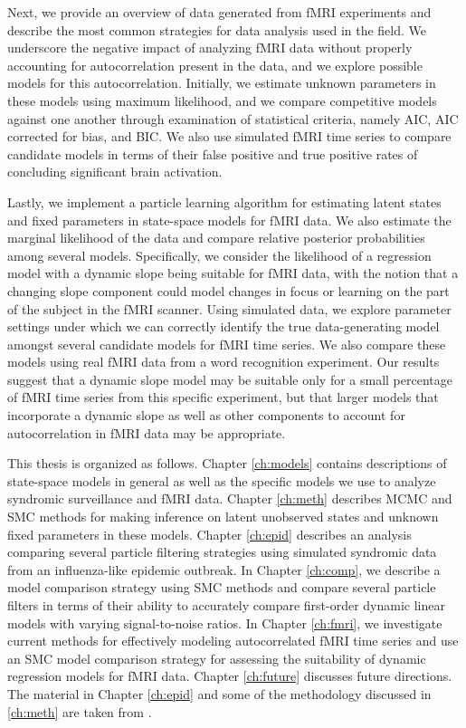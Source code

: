 Next, we provide an overview of data generated from fMRI experiments and describe the most common strategies for data analysis used in the field. We underscore the negative impact of analyzing fMRI data without properly accounting for autocorrelation present in the data, and we explore possible models for this autocorrelation. Initially, we estimate unknown parameters in these models using maximum likelihood, and we compare competitive models against one another through examination of statistical criteria, namely AIC, AIC corrected for bias, and BIC. We also use simulated fMRI time series to compare candidate models in terms of their false positive and true positive rates of concluding significant brain activation.

Lastly, we implement a particle learning algorithm for estimating latent states and fixed parameters in state-space models for fMRI data. We also estimate the marginal likelihood of the data and compare relative posterior probabilities among several models. Specifically, we consider the likelihood of a regression model with a dynamic slope being suitable for fMRI data, with the notion that a changing slope component could model changes in focus or learning on the part of the subject in the fMRI scanner. Using simulated data, we explore parameter settings under which we can correctly identify the true data-generating model amongst several candidate models for fMRI time series. We also compare these models using real fMRI data from a word recognition experiment. Our results suggest that a dynamic slope model may be suitable only for a small percentage of fMRI time series from this specific experiment, but that larger models that incorporate a dynamic slope as well as other components to account for autocorrelation in fMRI data may be appropriate.

This thesis is organized as follows. Chapter \ref{ch:models} contains descriptions of state-space models in general as well as the specific models we use to analyze syndromic surveillance and fMRI data. Chapter \ref{ch:meth} describes MCMC and SMC methods for making inference on latent unobserved states and unknown fixed parameters in these models. Chapter \ref{ch:epid} describes an analysis comparing several particle filtering strategies using simulated syndromic data from an influenza-like epidemic outbreak. In Chapter \ref{ch:comp}, we describe a model comparison strategy using SMC methods and compare several particle filters in terms of their ability to accurately compare first-order dynamic linear models with varying signal-to-noise ratios. In Chapter \ref{ch:fmri}, we investigate current methods for effectively modeling autocorrelated fMRI time series and use an SMC model comparison strategy for assessing the suitability of dynamic regression models for fMRI data. Chapter \ref{ch:future} discusses future directions. The material in Chapter \ref{ch:epid} and some of the methodology discussed in \ref{ch:meth} are taken from \citet{sheinson:niemi:meiring:epidtrack:2014}. 